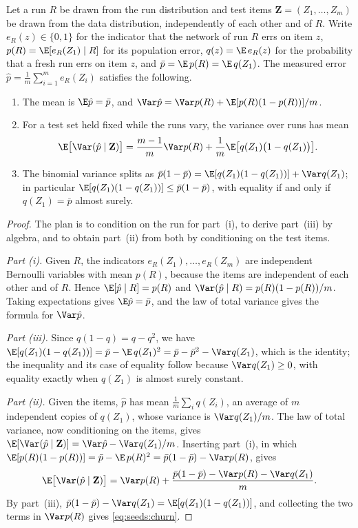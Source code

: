 \begin{refsection}
\begin{proposition}\label{prop:seeds:noise}
Let a run $R$ be drawn from the run distribution and test items $\mathbf Z=(Z_1,\dots,Z_m)$ be drawn from the data distribution, independently of each other and of $R$. Write $e_R(z)\in\{0,1\}$ for the indicator that the network of run $R$ errs on item $z$, $p(R)=\E[e_R(Z_1)\mid R]$ for its population error, $q(z)=\E\,e_R(z)$ for the probability that a fresh run errs on item $z$, and $\bar p=\E\,p(R)=\E\,q(Z_1)$. The measured error $\hat p=\frac1m\sum_{i=1}^me_R(Z_i)$ satisfies the following.
\begin{enumerate}
\item The mean is $\E\hat p=\bar p$, and $\Var\hat p=\Var p(R)+\E[p(R)(1-p(R))]/m$.
\item For a test set held fixed while the runs vary, the variance over runs has mean
\begin{equation}\label{eq:seeds:churn}
\E\bigl[\Var(\hat p\mid\mathbf Z)\bigr]=\frac{m-1}{m}\Var p(R)+\frac1m\E\bigl[q(Z_1)\bigl(1-q(Z_1)\bigr)\bigr].
\end{equation}
\item The binomial variance splits as $\bar p(1-\bar p)=\E[q(Z_1)(1-q(Z_1))]+\Var q(Z_1)$; in particular $\E[q(Z_1)(1-q(Z_1))]\le\bar p(1-\bar p)$, with equality if and only if $q(Z_1)=\bar p$ almost surely.
\end{enumerate}
\end{proposition}

\begin{proof}
The plan is to condition on the run for part~(i), to derive part~(iii) by algebra, and to obtain part~(ii) from both by conditioning on the test items.

\emph{Part (i).} Given $R$, the indicators $e_R(Z_1),\dots,e_R(Z_m)$ are independent Bernoulli variables with mean $p(R)$, because the items are independent of each other and of $R$. Hence $\E[\hat p\mid R]=p(R)$ and $\Var(\hat p\mid R)=p(R)(1-p(R))/m$. Taking expectations gives $\E\hat p=\bar p$, and the law of total variance gives the formula for $\Var\hat p$.

\emph{Part (iii).} Since $q(1-q)=q-q^2$, we have $\E[q(Z_1)(1-q(Z_1))]=\bar p-\E\,q(Z_1)^2=\bar p-\bar p^2-\Var q(Z_1)$, which is the identity; the inequality and its case of equality follow because $\Var q(Z_1)\ge0$, with equality exactly when $q(Z_1)$ is almost surely constant.

\emph{Part (ii).} Given the items, $\hat p$ has mean $\frac1m\sum_iq(Z_i)$, an average of $m$ independent copies of $q(Z_1)$, whose variance is $\Var q(Z_1)/m$. The law of total variance, now conditioning on the items, gives $\E[\Var(\hat p\mid\mathbf Z)]=\Var\hat p-\Var q(Z_1)/m$. Inserting part~(i), in which $\E[p(R)(1-p(R))]=\bar p-\E\,p(R)^2=\bar p(1-\bar p)-\Var p(R)$, gives
\[
\E\bigl[\Var(\hat p\mid\mathbf Z)\bigr]=\Var p(R)+\frac{\bar p(1-\bar p)-\Var p(R)-\Var q(Z_1)}{m}.
\]
By part~(iii), $\bar p(1-\bar p)-\Var q(Z_1)=\E[q(Z_1)(1-q(Z_1))]$, and collecting the two terms in $\Var p(R)$ gives \eqref{eq:seeds:churn}.
\end{proof}


\end{refsection}
